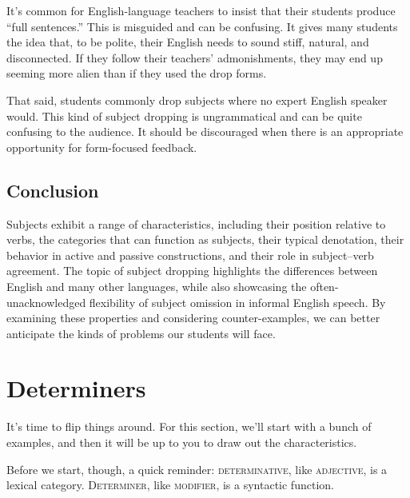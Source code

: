 It's common for English-language teachers to insist that their students produce ``full sentences.'' This is misguided and can be confusing. It gives many students the idea that, to be polite, their English needs to sound stiff, natural, and disconnected. If they follow their teachers' admonishments, they may end up seeming more alien than if they used the drop forms.

That said, students commonly drop subjects where no expert English speaker would. This kind of subject dropping is ungrammatical and can be quite confusing to the audience. It should be discouraged when there is an appropriate opportunity for form-focused feedback.

\subsection{Conclusion}
Subjects exhibit a range of characteristics, including their position relative to verbs, the categories that can function as subjects, their typical denotation, their behavior in active and passive constructions, and their role in subject--verb agreement. The topic of subject dropping highlights the differences between English and many other languages, while also showcasing the often-unacknowledged flexibility of subject omission in informal English speech. By examining these properties and considering counter-examples, we can better anticipate the kinds of problems our students will face.

\section{Determiners}
It's time to flip things around. For this section, we'll start with a bunch of examples, and then it will be up to you to draw out the characteristics.

Before we start, though, a quick reminder: \textsc{determinative}, like \textsc{adjective}, is a lexical category. \textsc{Determiner}, like \textsc{modifier}, is a syntactic function.

